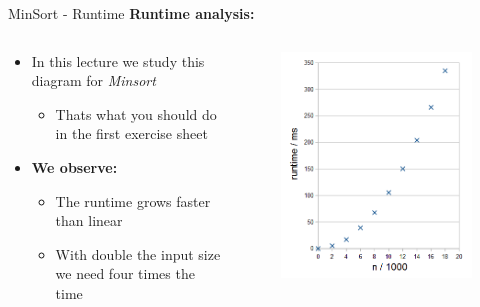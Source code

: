 
\begin{frame}{MinSort - Runtime}
  \textbf{Runtime analysis:}
  \vspace{-0.5em}
  \begin{columns}%
    \begin{column}[t]{0.5\textwidth}%
      \begin{itemize}
        \item
          In this lecture we study this diagram for \textit{Minsort}
          \begin{itemize}
            \item
              Thats what you should do in the first exercise sheet
          \end{itemize}
        \item<2- |handout:1>
          \textbf{We observe:}\\
          \begin{itemize}
            \item
              The runtime {\color{Mittel-Blau}grows faster than linear}
            \item
              With double the input size we need four times the time
          \end{itemize}
      \end{itemize}
    \end{column}%
    \begin{column}[t]{0.45\textwidth}%
      \begin{center}%
        \begin{figure}[!h]%
          \includegraphics[width=\textwidth]{Images/MinSort/Minsort.png}%

\end{figure}
\end{center}
\end{column}
\end{columns}
\end{frame}
